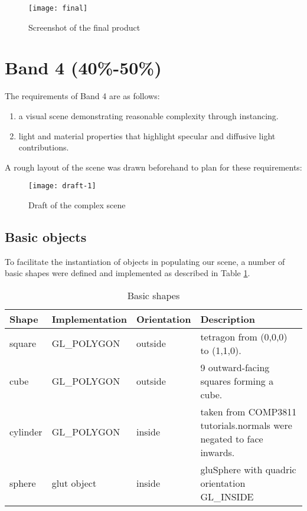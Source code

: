 \documentclass{article}
\begin{document}
	\bigskip

	\begin{figure}[h]
		\centering	
		\texttt{[image: final]}
		\caption{Screenshot of the final product}
		\label{final}
	\end{figure}
	\newpage
	\section{Band 4 (40\%-50\%)}
	The requirements of Band 4 are as follows:
	\begin{enumerate}
		\item a visual scene demonstrating reasonable complexity through instancing.
		\item light and material properties that highlight specular and diffusive light contributions.
	\end{enumerate}

	\noindent
	A rough layout of the scene was drawn beforehand to plan for these requirements:
	\begin{figure}[H]
		\centering	
		\texttt{[image: draft-1]}
		\caption{Draft of the complex scene}
		\label{draft}
	\end{figure}

		\subsection{Basic objects}
		To facilitate the instantiation of objects in populating our scene, a number of basic
		shapes were defined and implemented as described in Table \ref{shapes}.
		
		\begin{table}[H]
		\begin{tabularx}{\textwidth}{lllX}
		\textbf{Shape} & \textbf{Implementation} & \textbf{Orientation} & \textbf{Description}                                                         \\
		\hline
		square         & GL\_POLYGON             & outside              & tetragon from (0,0,0) to (1,1,0).                                            \\
		cube           & GL\_POLYGON             & outside              & 9 outward-facing squares forming a cube.                                     \\
		cylinder       & GL\_POLYGON             & inside               & taken from COMP3811 tutorials.\newline normals were negated to face inwards. \\
		sphere         & glut object             & inside               & gluSphere with quadric orientation GL\_INSIDE                                                                 
		\end{tabularx}
		\caption{Basic shapes}
		\label{shapes}
		\end{table}
\end{document}
